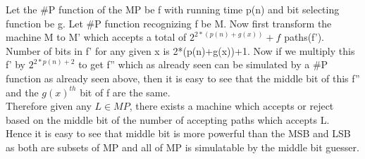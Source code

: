\documentclass[12pt]{exam}
\begin{document}
\begin{questions}
\begin{solution}
\begin{parts}
Let the \#P function of the MP be f with running time p(n)
and bit selecting function be g. Let \#P function recognizing f be M.
Now first transform the machine M to M' which accepts a total of
$2^{2*(p(n)+g(x))} + f$ paths(f'). Number of bits in f'
for any given x is 2*(p(n)+g(x))+1. Now if we multiply this f' by $2^{2*p(n)+2}$
to get f'' which as already seen can be simulated by a \#P function
as already seen above, then it is easy to see that the middle bit
of this f'' and the ${g(x)}^{th}$ bit of f are the same.\\

Therefore given any $L \in MP$, there exists a machine which accepts or reject
based on the middle bit of the number of accepting paths which accepts
L.\\

Hence it is easy to see that middle bit is more powerful than the MSB and
LSB as both are subsets of MP and all of MP is simulatable by the middle bit
guesser.
\end{parts}
\end{solution}
\end{questions}
\end{document}
